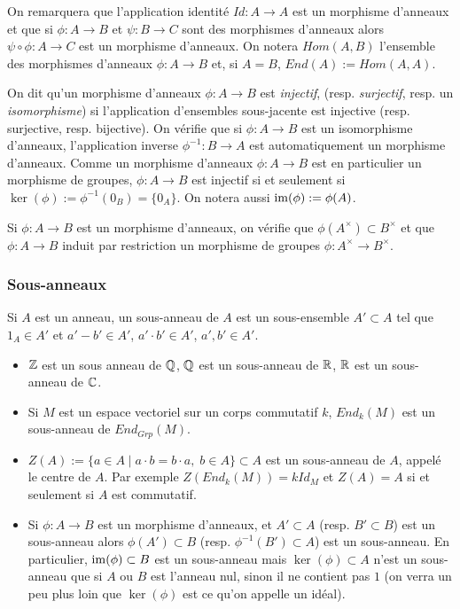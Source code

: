 On remarquera que l'application identité $Id:A\rightarrow A$ est un morphisme
d'anneaux et que si $\phi:A\rightarrow B$ et $\psi:B\rightarrow C$ sont des
morphismes d'anneaux alors $\psi\circ \phi:A\rightarrow C$ est un morphisme
d'anneaux. On notera $Hom(A,B)$ l'ensemble des morphismes d'anneaux
$\phi:A\rightarrow B$ et, si $A=B$, $End(A):=Hom(A,A)$.

On dit qu'un morphisme d'anneaux $\phi:A\rightarrow B$ est \emph{injectif},
(resp.  \emph{surjectif}, resp. un \emph{isomorphisme}) si l'application
d'ensembles sous-jacente est injective (resp. surjective, resp. bijective). On
vérifie que si $\phi:A\rightarrow B$ est un isomorphisme d'anneaux,
l'application inverse $\phi^{-1}:B\rightarrow A$ est automatiquement un
morphisme d'anneaux. Comme un morphisme d'anneaux $\phi:A\rightarrow B$ est en
particulier un morphisme de groupes, $\phi:A\rightarrow B$ est injectif si et
seulement si $\ker(\phi):=\phi^{-1}(0_B)=\lbrace 0_A\rbrace$. On notera aussi
$\operatorname{im}(\phi):=\phi(A)$.

Si $\phi:A\rightarrow B$ est un morphisme d'anneaux, on vérifie que
$\phi(A^\times)\subset B^\times$ et que $\phi:A\rightarrow B$ induit par
restriction un morphisme de groupes $\phi:A^\times\rightarrow B^\times$.

\subsubsection{Sous-anneaux}

Si $A$ est un anneau, un sous-anneau de $A$ est un
sous-ensemble $A'\subset A$ tel que $1_A\in A'$ et $a'-b'\in A'$, $a'\cdot
b'\in A'$, $a',b'\in A'$.

\begin{exemples}
    \begin{itemize}[leftmargin=* ,parsep=0cm,itemsep=0cm,topsep=0cm]
        \item $\mathbb{Z}$ est un sous anneau de $\mathbb{Q}$, $\mathbb{Q}$ est un sous-anneau de $\mathbb{R}$,
            $\mathbb{R}$ est un sous-anneau de $\mathbb{C}$. 
        \item Si $M$ est un espace vectoriel sur un corps commutatif $k$,
            $End_k(M)$ est un sous-anneau de $End_{Grp}(M)$. 
        \item $Z(A):=\lbrace a\in A\;|\; a\cdot b=b\cdot a,\; b\in
            A\rbrace\subset A$ est un sous-anneau de $A$, appelé le
            centre de $A$. Par exemple
            $Z(End_k(M))=kId_M$ et $Z(A)=A$ si et seulement si $A$ est
            commutatif. 
        \item Si $\phi:A\rightarrow B$ est un morphisme d'anneaux, et
            $A'\subset A$ (resp. $B'\subset B$) est un sous-anneau alors
            $\phi(A')\subset B$ (resp. $\phi^{-1}(B')\subset A$) est un
            sous-anneau. En particulier, $\operatorname{im}(\phi)\subset B$ est un
            sous-anneau mais  $\ker(\phi)\subset A$ n'est un sous-anneau que si
            $A$ ou $B$ est l'anneau nul, sinon il ne contient pas $1$ (on verra
            un peu plus loin que $\ker(\phi)$ est ce qu'on appelle un idéal).
    \end{itemize}
\end{exemples}

